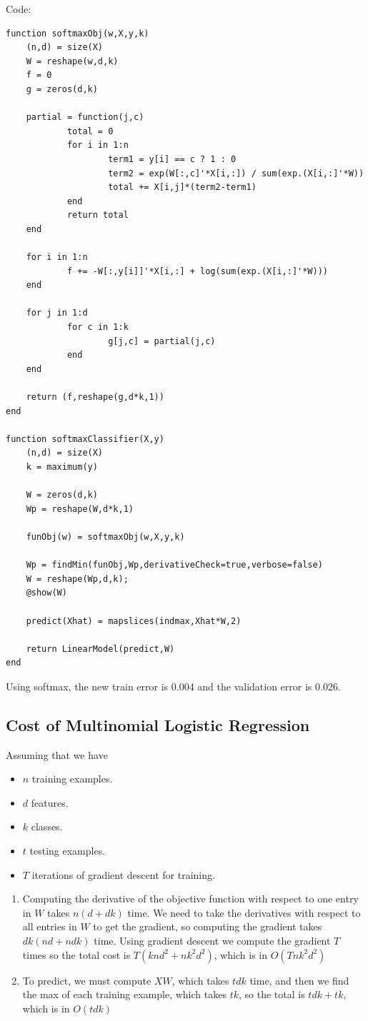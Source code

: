 \documentclass{article}
\def\items#1{\begin{itemize}#1\end{itemize}}
\def\enum#1{\begin{enumerate}#1\end{enumerate}}
\begin{document}
Code:
\begin{verbatim}
function softmaxObj(w,X,y,k)
    (n,d) = size(X)
    W = reshape(w,d,k)
    f = 0
    g = zeros(d,k)

    partial = function(j,c)
            total = 0
            for i in 1:n
                    term1 = y[i] == c ? 1 : 0
                    term2 = exp(W[:,c]'*X[i,:]) / sum(exp.(X[i,:]'*W))
                    total += X[i,j]*(term2-term1)
            end
            return total
    end

    for i in 1:n
            f += -W[:,y[i]]'*X[i,:] + log(sum(exp.(X[i,:]'*W)))
    end

    for j in 1:d
            for c in 1:k
                    g[j,c] = partial(j,c)
            end
    end

    return (f,reshape(g,d*k,1))
end

function softmaxClassifier(X,y)
    (n,d) = size(X)
    k = maximum(y)

    W = zeros(d,k)
    Wp = reshape(W,d*k,1)

    funObj(w) = softmaxObj(w,X,y,k)

    Wp = findMin(funObj,Wp,derivativeCheck=true,verbose=false)
    W = reshape(Wp,d,k);
    @show(W)

    predict(Xhat) = mapslices(indmax,Xhat*W,2)

    return LinearModel(predict,W)
end
\end{verbatim}

Using softmax, the new train error is 0.004 and the validation error is 0.026.

\subsection{Cost of Multinomial Logistic Regression}

Assuming that we have
\items{
\item $n$ training examples.
\item $d$ features.
\item $k$ classes.
\item $t$ testing examples.
\item $T$ iterations of gradient descent for training.
}
\enum{
\item Computing the derivative of the objective function with respect to one entry in $W$ takes $n(d + dk)$ time. We need to take the derivatives with respect to all entries in $W$ to get the gradient, so computing the gradient takes $dk(nd + ndk)$ time. Using gradient descent we compute the gradient $T$ times so the total cost is $T(knd^2 + nk^2d^2)$, which is in $O(Tnk^2d^2)$
\item To predict, we must compute $XW$, which takes $tdk$ time, and then we find the max of each training example, which takes $tk$, so the total is $tdk + tk$, which is in $O(tdk)$
}
\end{document}
